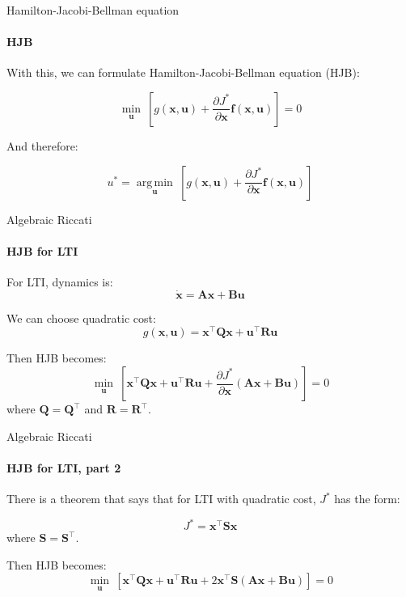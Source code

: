 \documentclass{beamer}
\DeclareMathOperator*{\argmin}{arg\,min}
\begin{document}
\begin{frame}{Hamilton-Jacobi-Bellman equation}
\framesubtitle{HJB}
\begin{flushleft}

With this, we can formulate Hamilton-Jacobi-Bellman equation (HJB):

\[
\underset{\mathbf u}{\min} \ [ g(\mathbf x, \mathbf u) + 
\frac{\partial J^*}{\partial \mathbf x} \mathbf f (\mathbf x, \mathbf u) ] = 0
\]

And therefore:

\[
u^* = \underset{\mathbf u}{\argmin} \ [ g(\mathbf x, \mathbf u) + 
\frac{\partial J^*}{\partial \mathbf x} \mathbf f (\mathbf x, \mathbf u) ]
\]

\end{flushleft}
\end{frame}

\begin{frame}{Algebraic Riccati}
\framesubtitle{HJB for LTI}
\begin{flushleft}

For LTI, dynamics is:
\[
\dot {\mathbf x} = \mathbf A  \mathbf x + \mathbf B \mathbf u
\]

We can choose quadratic cost:
\[
g(\mathbf  x, \mathbf  u) = 
\mathbf  x^\top \mathbf Q \mathbf x +
\mathbf  u^\top \mathbf R \mathbf u 
\]

Then HJB becomes:
\[
\underset{\mathbf u}{\min} \ [ 
\mathbf  x^\top \mathbf Q \mathbf x +
\mathbf  u^\top \mathbf R \mathbf u + 
\frac{\partial J^*}{\partial \mathbf x} 
(\mathbf A  \mathbf x + \mathbf B \mathbf u)] = 0
\]
%
where $\mathbf Q = \mathbf Q^\top$ and $\mathbf R = \mathbf R^\top$.

\end{flushleft}
\end{frame}


\begin{frame}{Algebraic Riccati}
\framesubtitle{HJB for LTI, part 2}
\begin{flushleft}

There is a theorem that says that for LTI with quadratic cost, $J^*$ has the form:

\[
J^* = \mathbf  x^\top \mathbf S \mathbf x
\]
%
where $\mathbf S = \mathbf S^\top$.

\bigskip

Then HJB becomes:
\[
\underset{\mathbf u}{\min} \ [ 
\mathbf  x^\top \mathbf Q \mathbf x +
\mathbf  u^\top \mathbf R \mathbf u + 
2\mathbf x^\top \mathbf S
(\mathbf A  \mathbf x + \mathbf B \mathbf u)] = 0
\]

\end{flushleft}
\end{frame}
\end{document}

